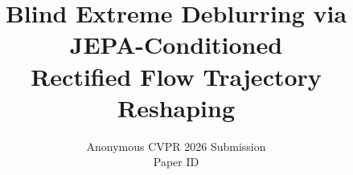 \documentclass[10pt,twocolumn,letterpaper]{article}
\title{Blind Extreme Deblurring via JEPA-Conditioned\\
       Rectified Flow Trajectory Reshaping}
\author{Anonymous CVPR 2026 Submission\\
Paper ID \paperID
}
\begin{document}
\maketitle








{
    \small
    
    
}

% 
\end{document}
